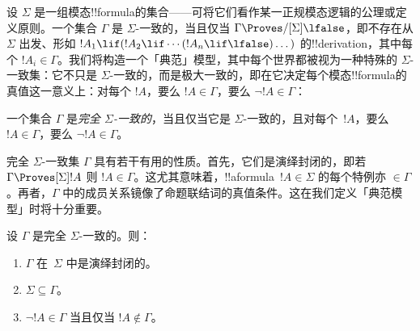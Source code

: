 \documentclass[../../../include/open-logic-section]{subfiles}
\begin{document}


设 $\Sigma$ 是一组模态!!{formula}的集合——可将它们看作某一正规模态逻辑的公理或定义原则。一个集合 $\Gamma$ 是 $\Sigma$-一致的，当且仅当 $\Gamma \Proves/[\Sigma] \lfalse$，即不存在从 $\Sigma$ 出发、形如 $!A_1 \lif (!A_2 \lif \cdots (!A_n \lif \lfalse)\dots)$ 的!!{derivation}，其中每个 $!A_i \in \Gamma$。我们将构造一个「典范」模型，其中每个世界都被视为一种特殊的 $\Sigma$-一致集：它不只是 $\Sigma$-一致的，而是极大一致的，即在它决定每个模态!!{formula}的真值这一意义上：对每个 $!A$，要么 $!A \in \Gamma$，要么 $\lnot !A \in \Gamma$：

\begin{defn}
  一个集合 $\Gamma$ 是\emph{完全 $\Sigma$-一致的}，当且仅当它是 $\Sigma$-一致的，且对每个~$!A$，要么 $!A \in \Gamma$，要么 $\lnot !A \in \Gamma$。
\end{defn}

完全 $\Sigma$-一致集 $\Gamma$ 具有若干有用的性质。首先，它们是演绎封闭的，即若 $\Gamma \Proves[\Sigma] !A$ 则 $!A \in \Gamma$。这尤其意味着，!!a{formula}~$!A \in \Sigma$ 的每个特例亦 $\in \Gamma$。再者，$\Gamma$ 中的成员关系镜像了命题联结词的真值条件。这在我们定义「典范模型」时将十分重要。

\begin{prop}
  设 $\Gamma$ 是完全 $\Sigma$-一致的。则：
  \begin{enumerate}
  \item {}%
    $\Gamma$ 在~$\Sigma$ 中是演绎封闭的。
  \item {}%
    $\Sigma \subseteq \Gamma$。
  \item {}%
    $\lnot!A \in \Gamma$ 当且仅当 $!A \notin \Gamma$。
  \end{enumerate}
\end{prop}
\end{document}
